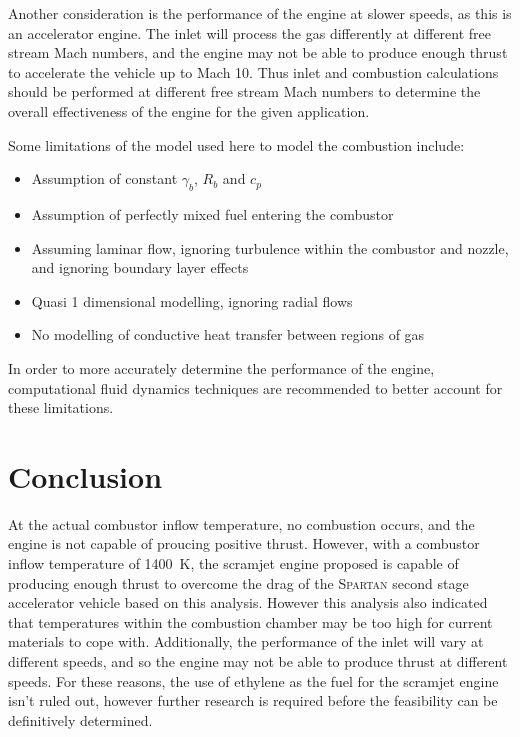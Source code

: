 \documentclass[a4paper]{article}
\begin{document}
Another consideration is the performance of the engine at slower speeds, as this is an accelerator engine. The inlet will process the gas differently at different free stream Mach numbers, and the engine may not be able to produce enough thrust to accelerate the vehicle up to Mach 10. Thus inlet and combustion calculations should be performed at different free stream Mach numbers to determine the overall effectiveness of the engine for the given application. 

Some limitations of the model used here to model the combustion include:

\begin{itemize}
    \item Assumption of constant \(\gamma_b\), \(R_b\) and \(c_p\)
    \item Assumption of perfectly mixed fuel entering the combustor
    \item Assuming laminar flow, ignoring turbulence within the combustor and nozzle, and ignoring boundary layer effects
    \item Quasi 1 dimensional modelling, ignoring radial flows
    \item No modelling of conductive heat transfer between regions of gas
\end{itemize}

In order to more accurately determine the performance of the engine, computational fluid dynamics techniques are recommended to better account for these limitations.

\section{Conclusion}
At the actual combustor inflow temperature, no combustion occurs, and the engine is not capable of proucing positive thrust. However, with a combustor inflow temperature of 1400~K, the scramjet engine proposed is capable of producing enough thrust to overcome the drag of the \textsc{Spartan} second stage accelerator vehicle based on this analysis. However this analysis also indicated that temperatures within the combustion chamber may be too high for current materials to cope with. Additionally, the performance of the inlet will vary at different speeds, and so the engine may not be able to produce thrust at different speeds. For these reasons, the use of ethylene as the fuel for the scramjet engine isn't ruled out, however further research is required before the feasibility can be definitively determined.
\end{document}
